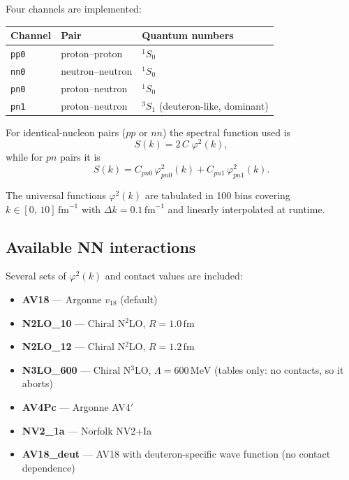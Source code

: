 \documentclass[11pt,a4paper]{article}
\newcommand{\unit}[1]{\,\mathrm{#1}}
\newcommand{\fm}{\unit{fm}}
\newcommand{\MeV}{\unit{MeV}}
\begin{document}
Four channels are implemented:
\begin{center}
\begin{tabular}{lll}
\toprule
Channel & Pair & Quantum numbers \\
\midrule
\texttt{pp0}  & proton--proton   & ${}^{1}S_{0}$ \\
\texttt{nn0}  & neutron--neutron & ${}^{1}S_{0}$ \\
\texttt{pn0}  & proton--neutron  & ${}^{1}S_{0}$ \\
\texttt{pn1}  & proton--neutron  & ${}^{3}S_{1}$ (deuteron-like, dominant) \\
\bottomrule
\end{tabular}
\end{center}

For identical-nucleon pairs ($pp$ or $nn$) the spectral function used is
\begin{equation}
  S(k) = 2\,C\;\varphi^{2}(k),
\end{equation}
while for $pn$ pairs it is
\begin{equation}
  S(k) = C_{pn0}\,\varphi_{pn0}^{2}(k) + C_{pn1}\,\varphi_{pn1}^{2}(k).
\end{equation}

The universal functions $\varphi^{2}(k)$ are tabulated in 100 bins
covering $k \in [0,\,10]\fm^{-1}$ with $\Delta k = 0.1\fm^{-1}$ and
linearly interpolated at runtime.

\subsection{Available NN interactions}

Several sets of $\varphi^{2}(k)$ and contact values are included:
\begin{itemize}[nosep]
  \item \textbf{AV18} --- Argonne $v_{18}$ (default)
  \item \textbf{N2LO\_10} --- Chiral N$^{2}$LO, $R = 1.0\fm$
  \item \textbf{N2LO\_12} --- Chiral N$^{2}$LO, $R = 1.2\fm$
  \item \textbf{N3LO\_600} --- Chiral N$^{3}$LO, $\Lambda = 600\MeV$ (tables only: no contacts, so it aborts)
  \item \textbf{AV4Pc} --- Argonne AV4$'$
  \item \textbf{NV2\_1a} --- Norfolk NV2+Ia
  \item \textbf{AV18\_deut} --- AV18 with deuteron-specific wave function
        (no contact dependence)
\end{itemize}
\end{document}
